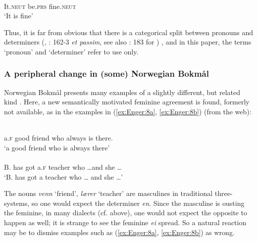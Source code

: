 \documentclass[output=paper]{langsci/langscibook}
\begin{document}
\begin{exe}
\begin{xlist}
\begin{xlist}
\ex\label{ex:Enger:7b} \\
It.\textsc{neut} be.\textsc{prs} fine.\textsc{neut}\\
\glt `It is fine'
\z \z

Thus, it is far from obvious that there is a categorical split between
pronouns and determiners %
(\citealt{Kristoffersen00}, \citealt{Halmoy16}: 162-3 \emph{et passim}, see also \citealt{Hansen11}: 183 for )%
%
, and
in this paper, the terms `pronoun' and `determiner' refer to use only.

\subsubsection{A peripheral change in (some) Norwegian Bokmål }

Norwegian Bokmål presents many examples of a slightly different, but
related kind %
\citep[see also][]{Enger12,Enger15}%
%
. Here, a new
semantically motivated feminine  agreement is found, formerly not
available, as in the examples in (\ref{ex:Enger:8a}, \ref{ex:Enger:8b}) (from the web):

\ea
\ea\label{ex:Enger:8a} \\
a.\textsc{f} good friend who always is there.\\
\glt `a good friend who is always there'\\

\ex\label{ex:Enger:8b} \\
B. has got a.\textsc{f} teacher who \ldots{}and she \ldots{}\\
\glt `B. has got a teacher who \ldots{} and she \ldots{}'\\
\z\z

The nouns \emph{venn} `friend', \emph{lærer} `teacher' are masculines in
traditional three- systems, so one would expect the determiner
\emph{en}. Since the masculine is ousting the feminine, in many dialects
(cf.   above), one would not expect the opposite to happen as
well; it is strange to see the feminine \emph{ei} spread. So a natural
reaction may be to dismiss examples such as (\ref{ex:Enger:8a}, \ref{ex:Enger:8b}) as wrong.


\end{xlist}
\end{xlist}
\end{exe}
\end{document}
